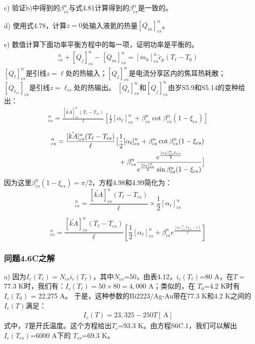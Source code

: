 c) 验证b)中得到的$\beta_{cs}^n$与式4.81计算得到的$\beta_{cs}^n$是一致的。 

d) 使用式4.78，计算$z=0$处输入液氦的热量$[Q_{in}]^n_{cs}$。

e) 数值计算下面功率平衡方程中的每一项，证明功率是平衡的。
\begin{align}%
[Q_\ell]_{cs}^{n}+[Q_j]_{cs}^{n}-[Q_{in}]_{cs}^{n}=[\dot{m}_h]_{cs}^{n}\tilde{c}_p(T_\ell-T_0)
\end{align}
$[Q_\ell]_{cs}^{n}$是引线$z=\ell$处的热输入；$[Q_j]_{cs}^{n}$是电流分享区内的焦耳热耗散；
$[Q_{\ell_{cs}}]_{cs}$是引线$z=\ell_{cs}$处的热输出。
$[Q_\ell]_{cs}^{n}$和$[Q_j]_{cs}^{n}$由岁S5.9和S5.14的变种给出：
\begin{align}%
[Q_\ell]_{cs}^{n}=\frac{[\tilde{kA}]_{cs}^{n}(T_\ell-T_{cs})}{\ell}[\frac{1}{2}[\alpha_\ell]_{cs}^{n}+\beta_{cs}^{n}\cot\beta_{cs}^{n}(1-\xi_{cs})]
\end{align}

\begin{align*}%
[Q_j]_{cs}^{n}=\frac{[\tilde{kA}]_{cs}^{n}(T_\ell-T_{cs})}{\ell}\big[&\frac{1}{2}[\alpha_\ell]_{cs}^{n}+\beta_{cs}^{n}\cot\beta_{cs}^{n}(1-\xi_{cs}) \\\notag
&+\beta_{cs}^{n}\frac{e^{\frac{[\alpha_\ell]_{cs}^{n}\xi_{cs}}{2}}}{e^{\frac{[\alpha_\ell]_{cs}^{n}}{2}}\sin\beta_{cs}^{n}(1-\xi_{cs})}\big]
\end{align*}
因为这里$\beta_{cs}^n (1-\xi_{cs})=\pi/2$，方程4.98和4.99简化为：
\begin{equation}%
[Q_\ell]_{cs}^{n}=\frac{[\tilde{kA}]_{cs}^{n}(T_\ell-T_{cs})}{\ell}\times\frac{1}{2}[\alpha_\ell]_{cs}^{n}
\end{equation}

\begin{equation}%
[Q_j]_{cs}^{n}=\frac{[\tilde{kA}]_{cs}^{n}(T_\ell-T_{cs})}{\ell}\left[\frac{1}{2}[\alpha_\ell]_{cs}^{n}+\beta_{cs}^{n}e^{\frac{[\alpha_\ell]_{cs}^{n}(\xi_{cs}-1)}{2}}\right]
\end{equation}

\subsubsection{问题4.6C之解}
a) 因为$I_c(T_\ell)=N_{cs}i_c(T_\ell)$，其中$N_{cs}$=50，由表4.12，$i_c(T_\ell)$=80 A，在$T=$77.3 K时，我们有：$I_c(T_\ell)= 50\times 80= 4,000$ A；类似的，在
$T_0$=4.2 K时有$I_c(T_0)$ = 22,275 A。
于是，这种参数的Bi2223/Ag-Au带在77.3 K和4.2 K之间的$I_c(T)$满足：
\begin{align*}
 I_c(T)=23,325-250T[\ \mathrm{A}] \tag{S6C.1}
\end{align*}
式中，$T$是开氏温度。这个方程给出$T_c$=93.3 K。由方程S6C.1，我们可以解出$I_c(T_{cs})$=6000 A下的
$T_{cs}$=69.3 K。

